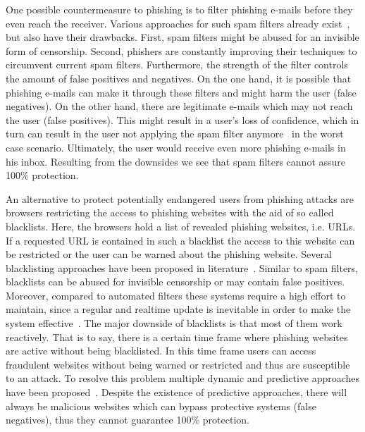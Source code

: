 \begin{description}[leftmargin=0cm]
	\item[Spam Filters:] One possible countermeasure to phishing is to filter phishing e-mails before they even reach the receiver.
 Various approaches for such spam filters already exist~\cite{bergholz2010new,chandrasekaran2006phishing,fette2007learning}, but also have their drawbacks.
 First, spam filters might be abused for an invisible form of censorship.
 Second, phishers are constantly improving their techniques to circumvent current spam filters.
 Furthermore, the strength of the filter controls the amount of false positives and negatives.
 On the one hand, it is possible that phishing e-mails can make it through these filters and might harm the user (false negatives). 
On the other hand, there are legitimate e-mails which may not reach the user (false positives). 
This might result in a user's loss of confidence, which in turn can result in the user not applying the spam filter anymore~\cite{olivo2011obtaining} in the worst case scenario. Ultimately, the user would receive even more phishing e-mails in his inbox.
Resulting from the downsides we see that spam filters cannot assure 100\% protection.
	\item[URL Blacklists:] An alternative to protect potentially endangered users from phishing attacks are browsers restricting the access to phishing websites with the aid of so called blacklists.
 Here, the browsers hold a list of revealed phishing websites, i.e. URLs.
 If a requested URL is contained in such a blacklist the access to this website can be restricted or the user can be warned about the phishing website.
 Several blacklisting approaches have been proposed in literature~\cite{ma2009beyond, zhang2008highly}. 
Similar to spam filters, blacklists can be abused for invisible censorship or may contain false positives.
Moreover, compared to automated filters these systems require a high effort to maintain, since a regular and realtime update is inevitable in order to make the system effective~\cite{purkait2012phishing}.
The major downside of blacklists is that most of them work reactively.
 That is to say, there is a certain time frame where phishing websites are active without being blacklisted.
 In this time frame users can access fraudulent websites without being warned or restricted and thus are susceptible to an attack.
 To resolve this problem multiple dynamic and predictive approaches have been proposed~\cite{prakash2010phishnet, obied2009fraudulent, balzarotti2012proactive}.
Despite the existence of predictive approaches, there will always be malicious websites which can bypass protective systems (false negatives), thus they cannot guarantee 100\% protection. 

\end{description}
